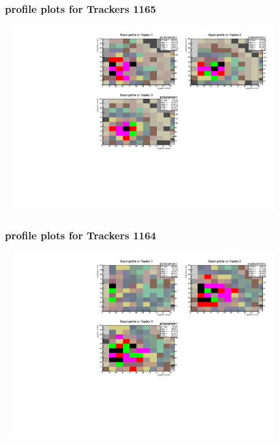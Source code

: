 \documentclass[slidestop,compress,mathserif]{beamer}
\begin{document}
\begin{frame}\frametitle{profile plots for Trackers 1165}
	 \includegraphics[width=12cm,height=8cm]{profile_plots_for_Trackers_1165.pdf}
\end{frame}
\begin{frame}\frametitle{profile plots for Trackers 1164}
	 \includegraphics[width=12cm,height=8cm]{profile_plots_for_Trackers_1164.pdf}
\end{frame}
\end{document}
